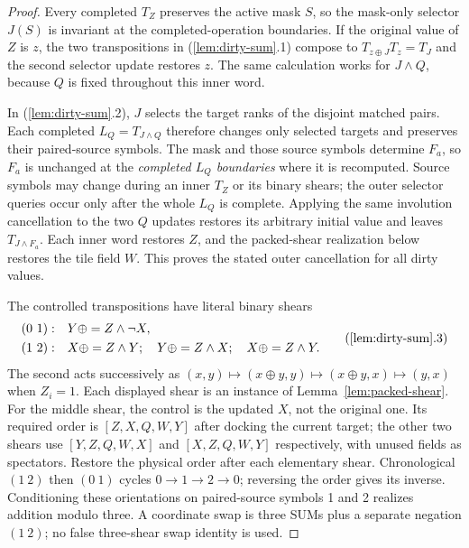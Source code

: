 \begin{proof}
Every completed $T_Z$ preserves the active mask $S$, so the mask-only
selector $J(S)$ is invariant at the completed-operation boundaries.
If the original value of $Z$ is $z$, the two transpositions in
(\ref{lem:dirty-sum}.1) compose to $T_{z\oplus J}T_z=T_J$ and the
second selector update restores $z$. The same calculation works for
$J\land Q$, because $Q$ is fixed throughout this inner word.

In (\ref{lem:dirty-sum}.2), $J$ selects the target ranks of the
disjoint matched pairs. Each completed $L_Q=T_{J\land Q}$ therefore
changes only selected targets and preserves their paired-source symbols.
The mask and those source symbols determine $F_a$, so $F_a$ is unchanged
at the \emph{completed $L_Q$ boundaries} where it is recomputed.
Source symbols may change during an inner $T_Z$ or its binary shears;
the outer selector queries occur only after the whole $L_Q$ is complete.
Applying the same involution cancellation to the two $Q$ updates
restores its arbitrary initial value and leaves $T_{J\land F_a}$.
Each inner word restores $Z$, and the packed-shear realization below
restores the tile field $W$. This proves the stated outer cancellation
for all dirty values.

The controlled transpositions have literal binary shears
\[
 \begin{aligned}
 (0\ 1):&\quad Y\mathbin\oplus=Z\land\neg X,\\
 (1\ 2):&\quad X\mathbin\oplus=Z\land Y;\quad
 Y\mathbin\oplus=Z\land X;\quad X\mathbin\oplus=Z\land Y.
 \end{aligned}
 \tag{\ref{lem:dirty-sum}.3}
\]
The second acts successively as $(x,y)\mapsto(x\oplus y,y)\mapsto(x\oplus y,x)\mapsto(y,x)$ when $Z_i=1$. Each displayed shear is an instance of Lemma~\ref{lem:packed-shear}. For the middle shear, the control is the updated $X$, not the original one. Its required order is $[Z,X,Q,W,Y]$ after docking the current target; the other two shears use $[Y,Z,Q,W,X]$ and $[X,Z,Q,W,Y]$ respectively, with unused fields as spectators. Restore the physical order after each elementary shear. Chronological $(1\ 2)$ then $(0\ 1)$ cycles $0\to1\to2\to0$; reversing the order gives its inverse. Conditioning these orientations on paired-source symbols 1 and 2 realizes addition modulo three. A coordinate swap is three SUMs plus a separate negation $(1\ 2)$; no false three-shear swap identity is used.\end{proof}

